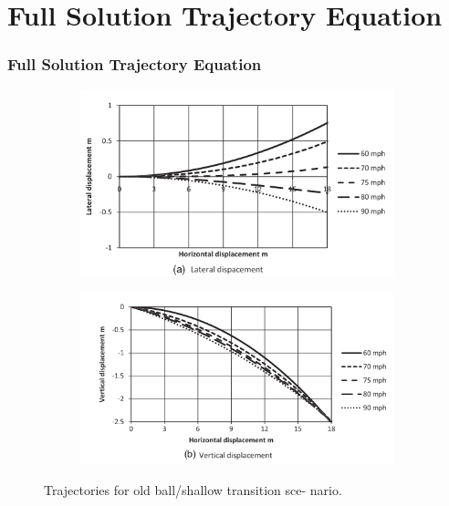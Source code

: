 \documentclass{beamer}
\begin{document}
\section{Full Solution Trajectory Equation}
\begin{frame}
\frametitle{Full Solution Trajectory Equation}

\begin{figure}[h!]
  \centering
  \begin{subfigure}[b]{0.5\linewidth}
    \includegraphics[width=\linewidth]{./figs/fs_5.png}
  \end{subfigure}
  \begin{subfigure}[b]{0.5\linewidth}
    \includegraphics[width=\linewidth]{./figs/fs_6.png}
  \end{subfigure}
  \caption{Trajectories for old ball/shallow transition sce-
nario.}
  \label{fig:fs56}
\end{figure}
\end{frame}
\end{document}
